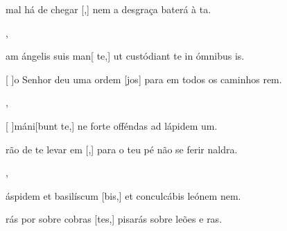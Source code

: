 {    {\item {} mal há de chegar [,] nem a desgraça baterá à ta.~\Antiphona},
  {\item {}am ángelis suis man[ te,] ut custódiant te in ómnibus is.~\Antiphona}%
    {\item {}[ ]{o} Senhor deu uma ordem [jos] para em todos os caminhos rem.~\Antiphona},
  {\item {}[ ]{má}ni[bunt te,] ne forte offéndas ad lápidem um.~\Antiphona}%
    {\item {}rão de te levar em [,] para o teu pé não se ferir naldra.~\Antiphona},
  {\item {} áspidem et basilíscum [bis,] et conculcábis leónem nem.~\Antiphona}%
    {\item {}rás por sobre cobras [tes,] pisarás sobre leões e ras.~\Antiphona}
}